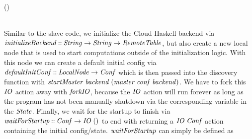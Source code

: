 \documentclass[paper=A4,twoside=true,openright,parskip=full,chapterprefix=true,headings=normal,bibliography=totoc,listof=totoc,titlepage=on,captions=tableabove,draft=false,british]{scrreprt}%
\begin{document}
\begin{hscode}\SaveRestoreHook
{}%
%
%
\>[B]{}\mathbin{::}\to {}\to {}\to {}\;\<[E]%
\\
\>[B]{}\;\;\;\mathrel{=}\<[E]%
\\
\>[B]{}\<[5]%
\>[5]{}\leftarrow {}\;\;\;\<[E]%
\\[\blanklineskip]%
\>[B]{}\<[5]%
\>[5]{}\leftarrow {}\;\<[E]%
\\[\blanklineskip]%
\>[B]{}\<[5]%
\>[5]{}\leftarrow {}\;\<[E]%
\\[\blanklineskip]%
\>[B]{}\<[5]%
\>[5]{}\mathbin{\$}\;\;(\;\;){}\<[E]%
\\[\blanklineskip]%
\>[B]{}\<[5]%
\>[5]{}\;\<[E]%
\\
\>[B]{}\<[5]%
\>[5]{}\;\<[E]%
\ColumnHook
\end{hscode}\resethooks
\vspace{-2\baselineskip}

Similar to the slave code, we initialize the Cloud Haskell backend via
\ensuremath{\Varid{initializeBackend}\mathbin{::}\Conid{String}\to \Conid{String}\to \Conid{RemoteTable}}, but also create
a new local node that is used to start computations outside of the
initialization logic. With this node we can create a default initial
config via \ensuremath{\Varid{defaultInitConf}\mathbin{::}\Conid{LocalNode}\to \Conid{Conf}} which is then passed
into the discovery function with
\ensuremath{\Varid{startMaster}\;\Varid{backend}\;(\Varid{master}\;\Varid{conf}\;\Varid{backend})}. We have to fork this \ensuremath{\Conid{IO}}
action away with \ensuremath{\Varid{forkIO}}, because the \ensuremath{\Conid{IO}} action will run forever as
long as the program has not been manually shutdown via the corresponding
variable in the \ensuremath{\Conid{State}}. Finally, we wait for the startup to finish via
\ensuremath{\Varid{waitForStartup}\mathbin{::}\Conid{Conf}\to \Conid{IO}\;()} to end with returning a \ensuremath{\Conid{IO}\;\Conid{Conf}}
action containing the initial config/state. \ensuremath{\Varid{waitForStartup}} can simply
be defined as
\end{document}
